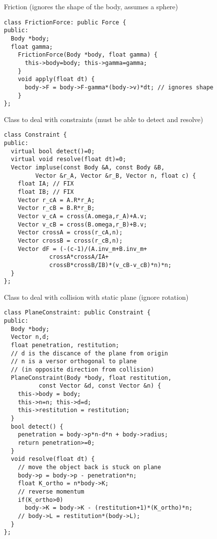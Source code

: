 Friction (ignores the shape of the body, assumes a sphere)
\begin{lstlisting}
class FrictionForce: public Force {
public:
  Body *body;
  float gamma;
    FrictionForce(Body *body, float gamma) {
      this->body=body; this->gamma=gamma;
    }
    void apply(float dt) {
      body->F = body->F-gamma*(body->v)*dt; // ignores shape
    }
};
\end{lstlisting}

Class to deal with constraints (must be able to detect and resolve)
\begin{lstlisting}
class Constraint {
public:  
  virtual bool detect()=0;
  virtual void resolve(float dt)=0;
  Vector impluse(const Body &A, const Body &B, 
		 Vector &r_A, Vector &r_B, Vector n, float c) {
    float IA; // FIX
    float IB; // FIX
    Vector r_cA = A.R*r_A;
    Vector r_cB = B.R*r_B;
    Vector v_cA = cross(A.omega,r_A)+A.v;
    Vector v_cB = cross(B.omega,r_B)+B.v;
    Vector crossA = cross(r_cA,n);
    Vector crossB = cross(r_cB,n);
    Vector dF = (-(c-1)/(A.inv_m+B.inv_m+
			 crossA*crossA/IA+
			 crossB*crossB/IB)*(v_cB-v_cB)*n)*n;
  }
};
\end{lstlisting}

Class to deal with collision with static plane
(ignore rotation)
\begin{lstlisting}
class PlaneConstraint: public Constraint {
public:
  Body *body;
  Vector n,d;
  float penetration, restitution;
  // d is the discance of the plane from origin
  // n is a versor orthogonal to plane 
  // (in opposite direction from collision)
  PlaneConstraint(Body *body, float restitution,
		  const Vector &d, const Vector &n) {
    this->body = body;
    this->n=n; this->d=d;
    this->restitution = restitution;
  }
  bool detect() {
    penetration = body->p*n-d*n + body->radius;
    return penetration>=0;
  }
  void resolve(float dt) {
    // move the object back is stuck on plane 
    body->p = body->p - penetration*n;
    float K_ortho = n*body->K;
    // reverse momentum
    if(K_ortho>0)
      body->K = body->K - (restitution+1)*(K_ortho)*n;
    // body->L = restitution*(body->L);
  }
};
\end{lstlisting}

